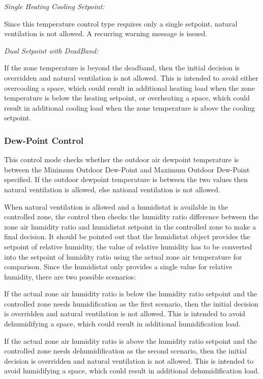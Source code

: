 \emph{Single Heating Cooling Setpoint:}

Since this temperature control type requires only a single setpoint, natural ventilation is not allowed. A recurring warning message is issued.

\emph{Dual Setpoint with DeadBand:}

If the zone temperature is beyond the deadband, then the initial decision is overridden and natural ventilation is not allowed. This is intended to avoid either overcooling a space, which could result in additional heating load when the zone temperature is below the heating setpoint, or overheating a space, which could result in additional cooling load when the zone temperature is above the cooling setpoint.

\subsubsection{Dew-Point Control}\label{dew-point-control}

This control mode checks whether the outdoor air dewpoint temperature is between the Minimum Outdoor Dew-Point and Maximum Outdoor Dew-Point specified. If the outdoor dewpoint temperature is between the two values then natural ventilation is allowed, else national ventilation is not allowed.

When natural ventilation is allowed and a humidistat is available in the controlled zone, the control then checks the humidity ratio difference between the zone air humidity ratio and humidistat setpoint in the controlled zone to make a final decision. It should be pointed out that the humidistat object provides the setpoint of relative humidity, the value of relative humidity has to be converted into the setpoint of humidity ratio using the actual zone air temperature for comparison. Since the humidistat only provides a single value for relative humidity, there are two possible scenarios:

If the actual zone air humidity ratio is below the humidity ratio setpoint and the controlled zone needs humidification as the first scenario, then the initial decision is overridden and natural ventilation is not allowed. This is intended to avoid dehumidifying a space, which could result in additional humidification load.

If the actual zone air humidity ratio is above the humidity ratio setpoint and the controlled zone needs dehumidification as the second scenario, then the initial decision is overridden and natural ventilation is not allowed. This is intended to avoid humidifying a space, which could result in additional dehumidification load.

